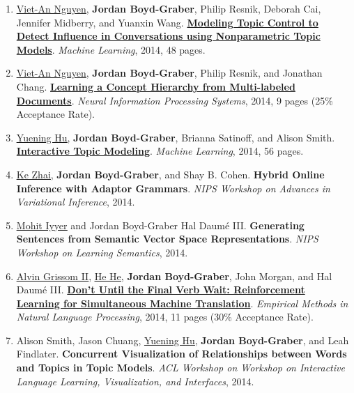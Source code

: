 \documentclass[10pt,a4paper]{article} %
\begin{document}
{\begin{enumerate}
	 \item \underline{\href{http://www.cs.umd.edu/~vietan/index.htm}{Viet-An Nguyen}}, {\bf Jordan Boyd-Graber}, Philip Resnik, Deborah Cai, Jennifer Midberry, and Yuanxin Wang.  {\bf \href{http://cs.colorado.edu/~jbg//docs/mlj_2013_influencer.pdf}{Modeling Topic Control to Detect Influence in Conversations using Nonparametric Topic Models}}.  \emph{Machine Learning}, 2014, 48 pages.

	 \item \underline{\href{http://www.cs.umd.edu/~vietan/index.htm}{Viet-An Nguyen}}, {\bf Jordan Boyd-Graber}, Philip Resnik, and Jonathan Chang.  {\bf \href{http://cs.colorado.edu/~jbg//docs/2014_nips_l2h.pdf}{Learning a Concept Hierarchy from Multi-labeled Documents}}.  \emph{Neural Information Processing Systems}, 2014, 9 pages (25\% Acceptance Rate).

	 \item \underline{\href{http://www.cs.umd.edu/~ynhu/}{Yuening Hu}}, {\bf Jordan Boyd-Graber}, Brianna Satinoff, and Alison Smith.  {\bf \href{http://cs.colorado.edu/~jbg//docs/mlj_2013_itm.pdf}{Interactive Topic Modeling}}.  \emph{Machine Learning}, 2014, 56 pages.

	 \item \underline{\href{http://www.umiacs.umd.edu/~zhaike/}{Ke Zhai}}, {\bf Jordan Boyd-Graber}, and Shay B. Cohen.  {\bf Hybrid Online Inference with Adaptor Grammars}.  \emph{NIPS Workshop on Advances in Variational Inference}, 2014.

	 \item \underline{\href{http://cs.umd.edu/~miyyer/}{Mohit Iyyer}} and Jordan Boyd-Graber Hal {Daum\'{e} III}.  {\bf Generating Sentences from Semantic Vector Space Representations}.  \emph{NIPS Workshop on Learning Semantics}, 2014.

	 \item \underline{\href{http://www.umiacs.umd.edu/~alvin/}{Alvin Grissom II}}, \underline{\href{http://www.umiacs.umd.edu/~hhe/}{He He}}, {\bf Jordan Boyd-Graber}, John Morgan, and Hal {Daum\'{e} III}.  {\bf \href{http://cs.colorado.edu/~jbg//docs/2014_emnlp_simtrans.pdf}{Don't Until the Final Verb Wait: Reinforcement Learning for Simultaneous Machine Translation}}.  \emph{Empirical Methods in Natural Language Processing}, 2014, 11 pages (30\% Acceptance Rate).

	 \item Alison Smith, Jason Chuang, \underline{\href{http://www.cs.umd.edu/~ynhu/}{Yuening Hu}}, {\bf Jordan Boyd-Graber}, and Leah Findlater.  {\bf Concurrent Visualization of Relationships between Words and Topics in Topic Models}.  \emph{ACL Workshop on Workshop on Interactive Language Learning, Visualization, and Interfaces}, 2014.


\end{enumerate}}
\end{document}
